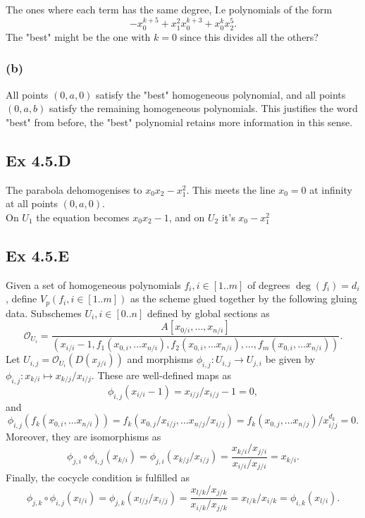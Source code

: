 \documentclass{article}
\theoremstyle{definition}
\newcommand{\oo}{\mathcal{O}}
\begin{document}
The ones where each term has the same degree, I.e polynomials of the form
\[
	-x_0^{k + 5} + x_1^{2}x_0^{k + 3} + x_0^{k}x_2^{5}.
\]
The "best" might be the one with $k = 0$ since this divides all the others?

\subsubsection*{(b)}

All points $(0, a, 0)$ satisfy the "best" homogeneous polynomial, and all
points $(0, a, b)$ satisfy the remaining homogeneous polynomials. This
justifies the word "best" from before, the "best" polynomial retains more
information in this sense.


\subsection*{Ex 4.5.D}

The parabola dehomogenises to $x_0x_2 - x_1^2$. This meets the
line $x_0 = 0$ at infinity at all points $(0, a, 0)$. \\

On $U_1$ the equation becomes $x_0x_2 - 1$, and on $U_2$ it's $x_0 - x_1^2$

\subsection*{Ex 4.5.E}

Given a set of homogeneous polynomials $f_i, i \in [1..m]$ of degrees
$\deg(f_i) = d_i$, define $V_p(f_i, i \in [1..m])$ as the scheme glued together
by the following gluing data. Subschemes $U_i, i \in [0..n]$ defined by global
sections as
\[
	\oo_{U_i}
	=
	\frac{A[x_{0/i}, \ldots, x_{n/i}]}
	{(x_{i/i} - 1, f_{1}(x_{0,i}, \ldots x_{n/i}), f_2(x_{0,i}, \ldots x_{n/i}), \ldots, f_{m}(x_{0,i}, \ldots x_{n/i}))}.
\]
Let $U_{i,j} = \oo_{U_i}(D(x_{j/i}))$ and morphisms $\phi_{i,j} : U_{i, j} \to
	U_{j, i}$ be given by $\phi_{i, j} : x_{k/i} \mapsto x_{k/j}/x_{i/j}$. These
are well-defined maps as
\[
	\phi_{i, j}(x_{i/i} - 1)
	=
	x_{i/j}/x_{i/j} - 1
	=
	0,
\]
and
\[
	\phi_{i,j}(f_{k}(x_{0,i}, \ldots x_{n/i}))
	=
	f_{k}(x_{0,j}/x_{i/j}, \ldots x_{n/j}/x_{i/j})
	=
	f_{k}(x_{0,j}, \ldots x_{n/j})/x_{i/j}^{d_k}
	=
	0.
\]
Moreover, they are isomorphisms as
\[
	\phi_{j, i} \circ \phi_{i, j} (x_{k/i})
	=
	\phi_{j,i}(
	x_{k/j}/x_{i/j}
	)
	=
	\frac{x_{k/i}/x_{j/i}}{x_{i/i}/x_{j/i}}
	=
	x_{k/i}.
\]
Finally, the cocycle condition is fulfilled as
\[
	\phi_{j, k} \circ \phi_{i, j} (x_{l/i})
	=
	\phi_{j, k}(x_{l/j}/x_{i/j})
	=
	\frac{x_{l/k}/x_{j/k}}{x_{i/k}/x_{j/k}}
	=
	x_{l/k}/x_{i/k}
	=
	\phi_{i, k}(x_{l/i}).
\]
\end{document}
